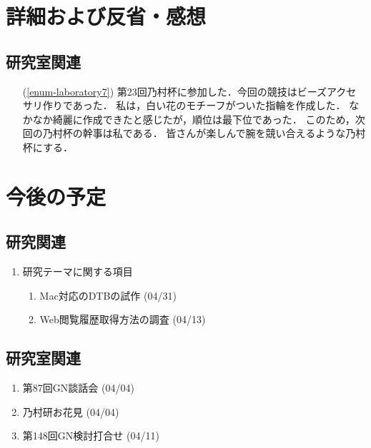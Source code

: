 \documentclass[fleqn, 14pt]{extarticle}
\begin{document}
\section{詳細および反省・感想}
\label{sec-3}
\subsection{研究室関連}
\label{sec-3-1}
\begin{itemize}
\item[(\ref{enum-laboratory7})]
第23回乃村杯に参加した．今回の競技はビーズアクセサリ作りであった．
私は，白い花のモチーフがついた指輪を作成した．
なかなか綺麗に作成できたと感じたが，順位は最下位であった．
このため，次回の乃村杯の幹事は私である．
皆さんが楽しんで腕を競い合えるような乃村杯にする．
\end{itemize}

\section{今後の予定}
\label{sec-4}
\subsection{研究関連}
\label{sec-4-1}
\begin{enumerate}
\item 研究テーマに関する項目
\hfill
\begin{enumerate}
\item Mac対応のDTBの試作
\hfill
(04/31)
\item Web閲覧履歴取得方法の調査
\hfill
(04/13)
\end{enumerate}
\end{enumerate}

\subsection{研究室関連}
\label{sec-4-2}
\begin{enumerate}
\item 第87回GN談話会
\hfill
\label{enum-3}
(04/04)
\item 乃村研お花見
\hfill
\label{enum-1}
(04/04)
\item 第148回GN検討打合せ
\hfill
\label{enum-4}
(04/11)
\end{enumerate}
\end{document}
